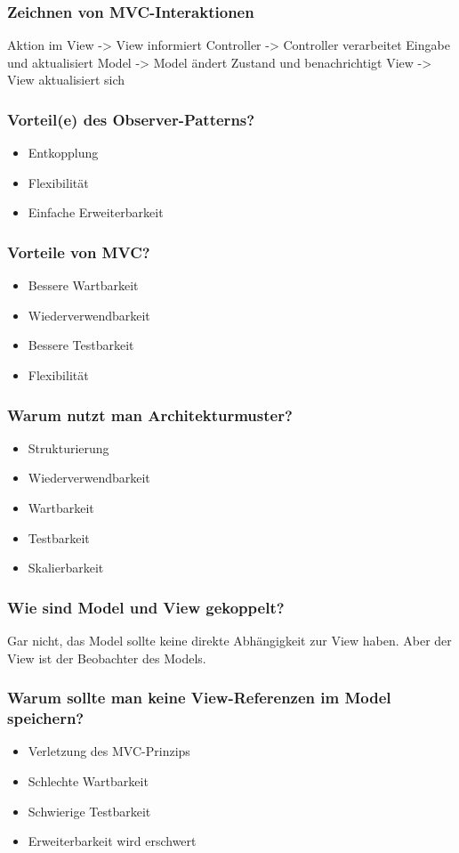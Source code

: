 \documentclass[main.tex]{subfiles}
\begin{document}
\subsubsection*{Zeichnen von MVC-Interaktionen}
Aktion im View -> View informiert Controller -> Controller verarbeitet Eingabe und aktualisiert Model -> Model ändert Zustand und benachrichtigt View -> View aktualisiert sich 
\subsubsection*{Vorteil(e) des Observer-Patterns?}
\begin{itemize}
    \item Entkopplung
    \item Flexibilität
    \item Einfache Erweiterbarkeit
\end{itemize}
\subsubsection*{Vorteile von MVC?}
\begin{itemize}
    \item Bessere Wartbarkeit
    \item Wiederverwendbarkeit
    \item Bessere Testbarkeit
    \item Flexibilität
\end{itemize}
\subsubsection*{Warum nutzt man Architekturmuster?}
\begin{itemize}
    \item Strukturierung
    \item Wiederverwendbarkeit
    \item Wartbarkeit
    \item Testbarkeit
    \item Skalierbarkeit
\end{itemize}
\subsubsection*{Wie sind Model und View gekoppelt?}
Gar nicht, das Model sollte keine direkte Abhängigkeit zur View haben. Aber der View ist der Beobachter des Models.  
\subsubsection*{Warum sollte man keine View-Referenzen im Model speichern?}
\begin{itemize}
    \item Verletzung des MVC-Prinzips
    \item Schlechte Wartbarkeit
    \item Schwierige Testbarkeit
    \item Erweiterbarkeit wird erschwert
\end{itemize}
\end{document}
